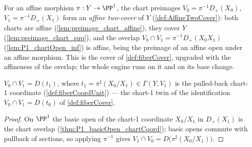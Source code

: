 \begin{definition}
  \label{def:fiberTwoCover}
  \leanok
  For an affine morphism \(\pi : Y \to \PP^1\), the chart preimages
  \(V_0 = \pi^{-1}D_+(X_0)\), \(V_1 = \pi^{-1}D_+(X_1)\) form an \emph{affine two-cover}
  of \(Y\) (\ref{def:AffineTwoCover}): both charts are affine
  (\ref{lem:preimage_chart_affine}), they cover \(Y\)
  (\ref{lem:preimage_chart_sup}), and the overlap
  \(V_0 \cap V_1 = \pi^{-1}D_+(X_0 X_1)\) (\ref{lem:P1_chartOpen_inf}) is affine, being
  the preimage of an affine open under an affine morphism. This is the cover of
  \ref{def:fiberCover}, upgraded with the affineness of the overlap; the whole engine
  runs on it and on its base change.
\end{definition}

\begin{theorem}
  \label{thm:preimage_inf_eq_basicOpen_fiberCoord1}
  \leanok
  \(V_0 \cap V_1 = D(t_1)\), where \(t_1 = \pi^{\sharp}(X_0/X_1) \in \Gamma(Y, V_1)\)
  is the pulled-back chart-1 coordinate (\ref{def:fiberCoordUnit}) --- the chart-1 twin
  of the identification \(V_0 \cap V_1 = D(t_0)\) of \ref{def:fiberCover}.
\end{theorem}
\begin{proof}
  \leanok
  On \(\PP^1\) the basic open of the chart-1 coordinate \(X_0/X_1\) in \(D_+(X_1)\) is
  the chart overlap (\ref{thm:P1_basicOpen_chartCoord}); basic opens commute with
  pullback of sections, so applying \(\pi^{-1}\) gives
  \(V_1 \cap V_0 = D\bigl(\pi^{\sharp}(X_0/X_1)\bigr)\).
\end{proof}

